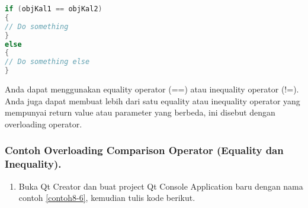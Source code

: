 \begin{lstlisting}[language=c++, numbers=none]
if (objKal1 == objKal2)
{
// Do something
}
else
{
// Do something else
}
\end{lstlisting}

Anda dapat menggunakan equality operator (==) atau inequality operator
(!=). Anda juga dapat membuat lebih dari satu equality atau inequality
operator yang mempunyai return value atau parameter yang berbeda, ini
disebut dengan overloading operator.

\subsubsection*{Contoh  Overloading Comparison Operator (Equality dan Inequality).}

\begin{enumerate}

\item
  Buka Qt Creator dan buat project Qt Console Application baru dengan
  nama contoh \ref{contoh8-6}, kemudian tulis kode berikut.


\end{enumerate}
